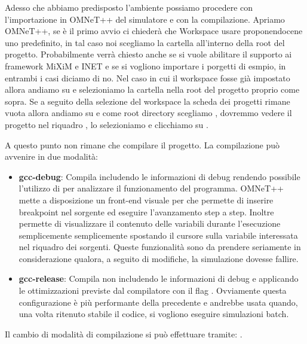 Adesso che abbiamo predisposto l'ambiente possiamo procedere con l'importazione in OMNeT++ del simulatore e con la compilazione. Apriamo OMNeT++, se è il primo avvio ci chiederà che Workspace usare proponendocene uno predefinito, in tal caso noi scegliamo la cartella  all'interno della root del progetto. Probabilmente verrà chiesto anche se si vuole abilitare il supporto ai framework MiXiM e INET e se si vogliono importare i porgetti di esmpio, in entrambi i casi diciamo di no. Nel caso in cui il workspace fosse già impostato allora andiamo su  e selezioniamo la cartella  nella root del progetto proprio come sopra. Se a seguito della selezione del workspace  la scheda dei progetti rimane vuota allora andiamo su  e come root directory scegliamo , dovremmo vedere il progetto  nel riquadro , lo selezioniamo e clicchiamo su .

A questo punto non rimane che compilare il progetto. La compilazione può avvenire in due modalità:

\begin{itemize}
	\item \textbf{gcc-debug}: Compila includendo le informazioni di debug rendendo possibile l'utilizzo di  per analizzare il funzionamento del programma. OMNeT++ mette a disposizione un front-end visuale per  che permette di inserire breakpoint nel sorgente ed eseguire l'avanzamento step a step. Inoltre permette di visualizzare il contenuto delle variabili durante l'esecuzione semplicemente semplicemente spostando il cursore sulla variabile interessata nel riquadro dei sorgenti. Queste funzionalità sono da prendere seriamente in considerazione qualora, a seguito di modifiche, la simulazione dovesse fallire.
	\item \textbf{gcc-release}: Compila non includendo le informazioni di debug e applicando le ottimizzazioni previste dal compilatore  con il flag . Ovviamente questa configurazione è più performante della precedente e andrebbe usata quando, una volta ritenuto stabile il codice, si vogliono eseguire simulazioni batch.
\end{itemize}

Il cambio di modalità di compilazione si può effettuare tramite: .

